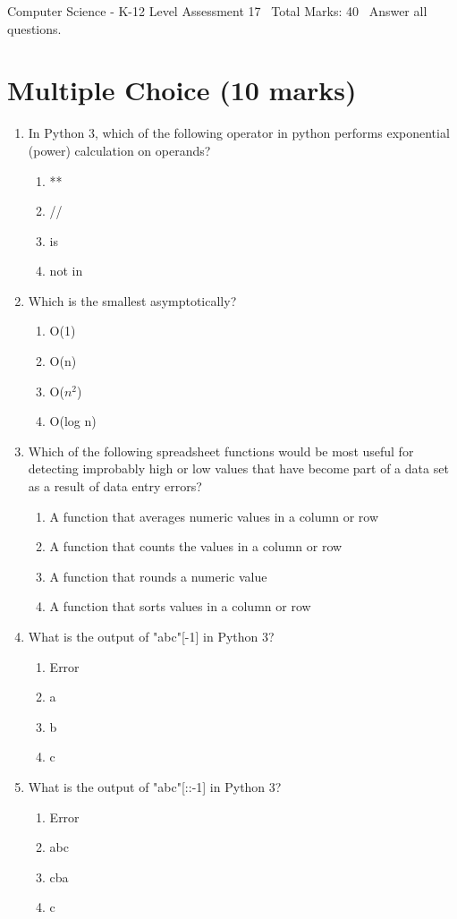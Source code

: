 \documentclass[12pt]{article}
\begin{document}
\begin{center}
Computer Science - K-12 Level Assessment 17 \
Total Marks: 40 \
Answer all questions.
\end{center}

\section*{Multiple Choice (10 marks)}
\begin{enumerate}[label=\arabic*.]
\item In Python 3, which of the following operator in python performs exponential (power) calculation on operands?
\begin{enumerate}[label=(\alph*)]
    \item **
    \item //
    \item is
    \item not in
\end{enumerate}
\item Which is the smallest asymptotically?
\begin{enumerate}[label=(\alph*)]
    \item O(1)
    \item O(n)
    \item O($n^2$)
    \item O(log n)
\end{enumerate}
\item Which of the following spreadsheet functions would be most useful for detecting improbably high or low values that have become part of a data set as a result of data entry errors?
\begin{enumerate}[label=(\alph*)]
    \item A function that averages numeric values in a column or row
    \item A function that counts the values in a column or row
    \item A function that rounds a numeric value
    \item A function that sorts values in a column or row
\end{enumerate}
\item What is the output of "abc"[-1] in Python 3?
\begin{enumerate}[label=(\alph*)]
    \item Error
    \item a
    \item b
    \item c
\end{enumerate}
\item What is the output of "abc"[::-1] in Python 3?
\begin{enumerate}[label=(\alph*)]
    \item Error
    \item abc
    \item cba
    \item c
\end{enumerate}
\end{enumerate}
\end{document}
